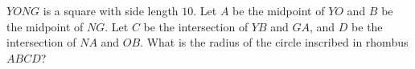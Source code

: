 $Y ONG$ is a square with side length $10$. Let $A$ be the midpoint of $Y O$ and $B$ be the midpoint of $NG$. Let $C$ be the intersection of $Y B$ and $GA$, and $D$ be the intersection of $NA$ and $OB$. What is the radius of the circle inscribed in rhombus $ABCD$?
